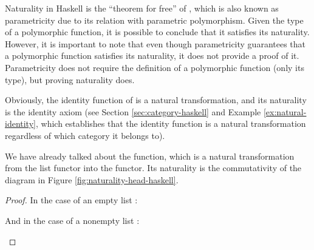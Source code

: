 Naturality in Haskell is the ``theorem for free'' of
\parencite{wadler-1989}, which is also known as parametricity due to
its relation with parametric polymorphism. Given the type of a
polymorphic function, it is possible to conclude that it satisfies its
naturality. However, it is important to note that even though
parametricity guarantees that a polymorphic function satisfies its
naturality, it does not provide a proof of it. Parametricity does not
require the definition of a polymorphic function (only its type), but
proving naturality does.

\begin{example}
  \label{ex:natural-identity-haskell}

  Obviously, the identity function of \hask is a natural
  transformation, and its naturality is the identity axiom (see
  Section \ref{sec:category-haskell} and Example
  \ref{ex:natural-identity}, which establishes that the identity
  function is a natural transformation regardless of which category it
  belongs to).

\end{example}

\begin{example}
  \label{ex:natural-head-haskell}

  We have already talked about the  function, which
  is a natural transformation from the list functor into the
   functor. Its naturality is the commutativity of
  the diagram in Figure \ref{fig:naturality-head-haskell}.

  \begin{proof}

    In the case of an empty list \texthaskell{[]}:
    \begin{steps}
    \end{steps}
    And in the case of a nonempty list :
    \begin{steps}
    \end{steps}

  \end{proof}

\end{example}

